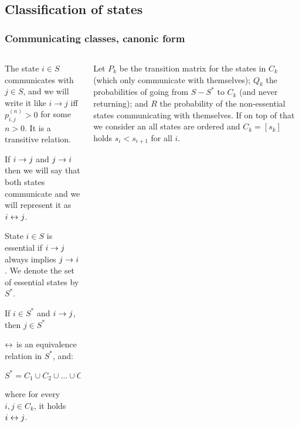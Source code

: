 \subsection{Classification of states}
 \begin{frame}\frametitle{Communicating classes, canonic form}
    \vspace{2em}
    \begin{columns}
        \begin{column}{0.5\textwidth}
            \begin{definition}
            The state \(i\in S\) communicates with \(j\in S\), and we will write it like 
            \(i \rightarrow j\) iff \(p_{i,j}^{(n)} > 0\) for some \(n > 0\). It is a 
            transitive relation.

            If \(i \rightarrow j\) and \(j \rightarrow i\) then we will say that both states communicate and
            we will represent it as \(i \leftrightarrow j\).
            \end{definition}

            \begin{definition}
            State \(i\in S\) is essential if \(i \rightarrow j\) always implies \(j \rightarrow i\). We denote the set
            of essential states by \(S^{\ast}\).
            \end{definition}

            \begin{lemma}
            If \(i\in S^{\ast}\) and \(i \rightarrow j\), then \(j \in S^{\ast}\)
            \end{lemma}

            \begin{proposition}
            \(\leftrightarrow\) is an equivalence relation in \(S^{\ast}\), and:

            \[
            S^{\ast} = C_1 \cup C_2 \cup \ldots \cup C_r
            \]

            where for every \(i, j \in C_k\), it holds \(i \leftrightarrow j\).
            \end{proposition}
        \end{column}
        \begin{column}{0.5\textwidth}
        Let $P_k$ be the transition matrix for the states in $C_k$ (which only 
        communicate with themselves); $Q_k$ the probabilities of going from 
        $S - S^{\ast}$ to $C_k$ (and never returning); and $R$ the probability
        of the non-essential states communicating with themselves. If on top of
        that we consider an all states are ordered and $C_k = [s_k]$ holds 
        \(s_{i} < s_{i + 1}\) for all \(i\).
        

\end{column}
\end{columns}
\end{frame}
